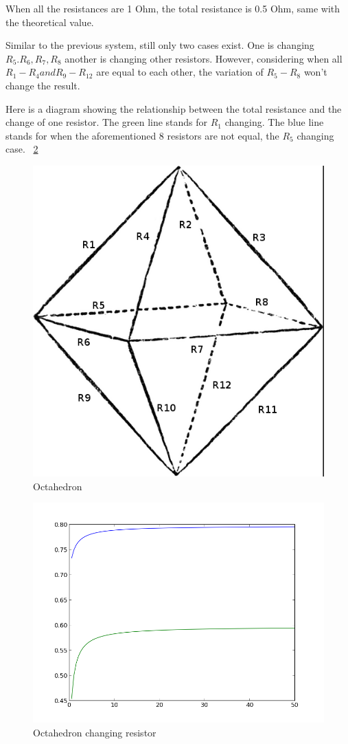 \documentclass[11pt,letterpaper]{article}
\begin{document}
When all the resistances are 1 Ohm, the total resistance is 0.5 Ohm, same with the theoretical value.

Similar to the previous system, still only two cases exist. One is changing $R_5.R_6,R_7,R_8$ another is changing other resistors.
However, considering when all $R_1-R_4 and R_9-R_{12}$ are equal to each other, the variation of $R_5-R_8$ won't change the result.

Here is a diagram showing the relationship between the total resistance and the change of one resistor. The green line stands for $R_1$ changing. The blue line stands for when the aforementioned 8 resistors are not equal, the $R_5$ changing case. ~\ref{figure4} 

\newpage
\begin{figure}
\begin{center}
\includegraphics[width=0.6\linewidth,angle=0]{oc.png}
\caption{Octahedron}
\label{figure3}
\end{center}
\end{figure}


\begin{figure}
\begin{center}
\includegraphics[width=0.6\linewidth,angle=0]{p3.png}
\caption{Octahedron changing resistor}
\label{figure4}
\end{center}
\end{figure}
\end{document}
